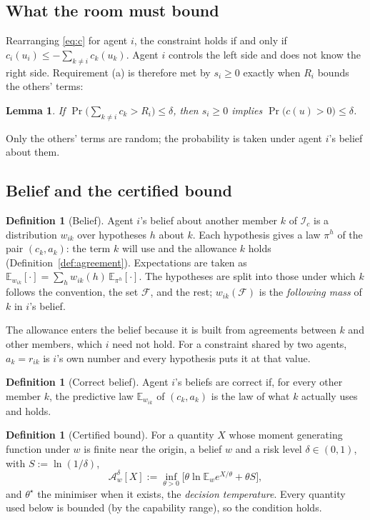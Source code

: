 \documentclass[11pt]{article}
\newtheorem{lemma}[theorem]{Lemma}
\theoremstyle{definition}
\newtheorem{definition}[theorem]{Definition}
\theoremstyle{remark}
\newcommand{\A}{\mathcal{A}}
\newcommand{\I}{\mathcal{I}}
\newcommand{\E}{\mathbb{E}}
\newcommand{\F}{\mathcal{F}}
\renewcommand{\Pr}{\operatorname{Pr}}
\begin{document}
\subsection{What the room must bound}
Rearranging \eqref{eq:c} for agent $i$, the constraint holds if and only if $c_i(u_i)\le-\sum_{k\ne i}c_k(u_k)$. Agent $i$ controls the left side and does not know the right side. Requirement (a) is therefore met by $s_i\ge0$ exactly when $R_i$ bounds the others' terms:

\begin{lemma}\label{lem:room}
If $\Pr\big(\sum_{k\ne i}c_k>R_i\big)\le\delta$, then $s_i\ge0$ implies $\Pr\big(c(u)>0\big)\le\delta$.
\end{lemma}
Only the others' terms are random; the probability is taken under agent $i$'s belief about them.

\subsection{Belief and the certified bound}
\begin{definition}[Belief]\label{def:belief}
Agent $i$'s belief about another member $k$ of $\I_c$ is a distribution $w_{ik}$ over hypotheses $h$ about $k$. Each hypothesis gives a law $\pi^h$ of the pair $(c_k,a_k)$: the term $k$ will use and the allowance $k$ holds (Definition~\ref{def:agreement}). Expectations are taken as $\E_{w_{ik}}[\cdot]=\sum_h w_{ik}(h)\,\E_{\pi^h}[\cdot]$. The hypotheses are split into those under which $k$ follows the convention, the set $\F$, and the rest; $w_{ik}(\F)$ is the \emph{following mass} of $k$ in $i$'s belief.
\end{definition}

The allowance enters the belief because it is built from agreements between $k$ and other members, which $i$ need not hold. For a constraint shared by two agents, $a_k=r_{ik}$ is $i$'s own number and every hypothesis puts it at that value.

\begin{definition}[Correct belief]
Agent $i$'s beliefs are correct if, for every other member $k$, the predictive law $\E_{w_{ik}}$ of $(c_k,a_k)$ is the law of what $k$ actually uses and holds.
\end{definition}

\begin{definition}[Certified bound]\label{def:A}
For a quantity $X$ whose moment generating function under $w$ is finite near the origin, a belief $w$ and a risk level $\delta\in(0,1)$, with $S:=\ln(1/\delta)$,
\[
\A^\delta_w[X]:=\inf_{\theta>0}\Big[\theta\ln\E_w e^{X/\theta}+\theta S\Big],
\]
and $\theta^\star$ the minimiser when it exists, the \emph{decision temperature}. Every quantity used below is bounded (by the capability range), so the condition holds.
\end{definition}
\end{document}
